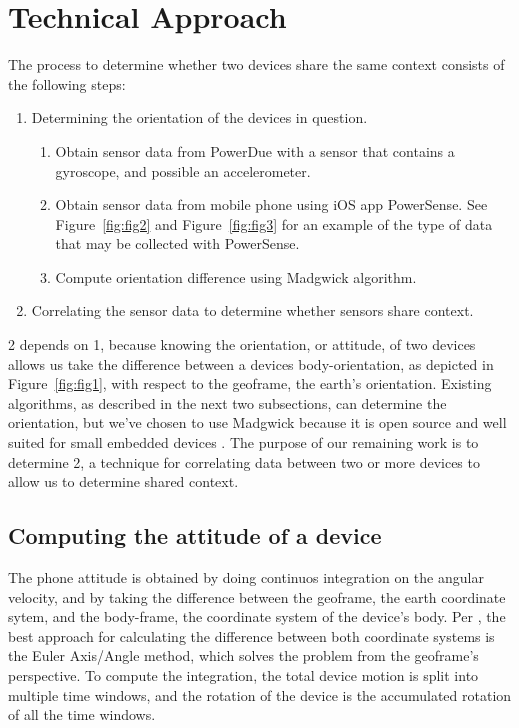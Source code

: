 \documentclass[journal]{IEEEtranTIE}
\begin{document}
\section{Technical Approach}

The process to determine whether two devices share the same context consists of
the following steps:

\begin{enumerate}
\item Determining the orientation of the devices in question.
\begin{enumerate}
\item Obtain sensor data from PowerDue with a sensor that contains a gyroscope,
      and possible an accelerometer.
\item Obtain sensor data from mobile phone using iOS app PowerSense. See
      Figure~\ref{fig:fig2} and Figure~\ref{fig:fig3} for an example of the type
      of data that may be collected with PowerSense.
\item Compute orientation difference using Madgwick algorithm.
\end{enumerate}
\item Correlating the sensor data to determine whether sensors share context.
\end{enumerate}

2 depends on 1, because knowing the orientation, or attitude, of two devices
allows us take the difference between a devices body-orientation, as depicted in
Figure~\ref{fig:fig1}, with respect to the geoframe, the earth's orientation. Existing
algorithms, as described in the next two subsections, can determine the
orientation, but we've chosen to use Madgwick because it is open source and well
suited for small embedded devices \cite{Madgwick}. The purpose of our remaining
work is to determine 2, a technique for correlating data between two or more
devices to allow us to determine shared context.

\subsection{Computing the attitude of a device}

The phone attitude is obtained by doing continuos integration on the angular
velocity, and by taking the difference between the geoframe, the earth
coordinate sytem, and the body-frame, the coordinate system of the device's
body. Per \cite{PhoneAttitude}, the best approach for calculating the difference
between both coordinate systems is the Euler Axis/Angle method, which solves the
problem from the geoframe's perspective. To compute the integration, the total
device motion is split into multiple time windows, and the rotation of the
device is the accumulated rotation of all the time windows.
\end{document}
